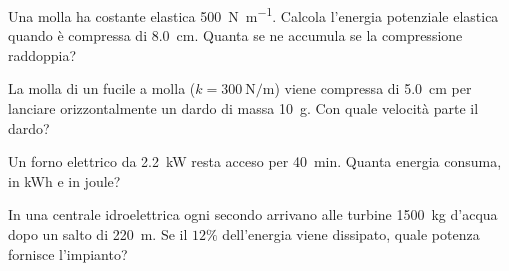 \begin{esercizio}
Una molla ha costante elastica \SI{500}{\newton\per\metre}. Calcola l'energia potenziale elastica quando è compressa di \SI{8,0}{\centi\metre}. Quanta se ne accumula se la compressione raddoppia?\\
\end{esercizio}

\begin{esercizio}
La molla di un fucile a molla ($k = \SI{300}{\newton\per\metre}$) viene compressa di \SI{5,0}{\centi\metre} per lanciare orizzontalmente un dardo di massa \SI{10}{\gram}. Con quale velocità parte il dardo?\\
\end{esercizio}

\begin{esercizio}
Un forno elettrico da \SI{2,2}{\kilo\watt} resta acceso per \SI{40}{\minute}. Quanta energia consuma, in kWh e in joule?\\
\end{esercizio}

\begin{esercizio}
In una centrale idroelettrica ogni secondo arrivano alle turbine \SI{1500}{\kilo\gram} d'acqua dopo un salto di \SI{220}{\metre}. Se il $12\%$ dell'energia viene dissipato, quale potenza fornisce l'impianto?\\
\end{esercizio}
